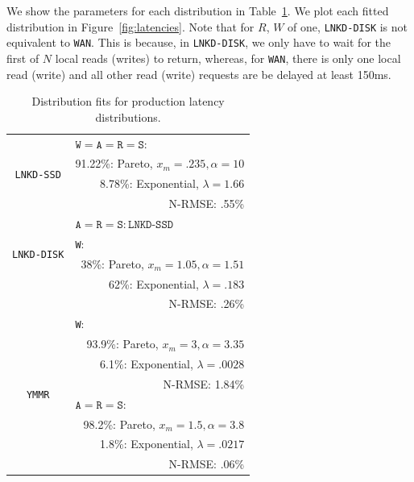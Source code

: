\documentclass{vldb}
\begin{document}
We show the parameters for each distribution in
Table~\ref{table:fits}. We plot each fitted distribution in
Figure~\ref{fig:latencies}.  Note that for $R$, $W$ of one,
\texttt{LNKD-DISK} is not equivalent to \texttt{WAN}.  This is
because, in \texttt{LNKD-DISK}, we only have to wait for the first of
$N$ local reads (writes) to return, whereas, for \texttt{WAN}, there
is only one local read (write) and all other read (write) requests are
be delayed at least 150ms.


\begin{table}
\centering
\begin{tabular}{|c|r|}
\hline
\multirow{4}{*}{\texttt{LNKD-SSD}} & \multicolumn{1}{|l|}{$\texttt{W} = \texttt{A}= \texttt{R} = \texttt{S}:$} \\
& 91.22\%: Pareto, $x_m=.235, \alpha=10$\\
& 8.78\%: Exponential, $\lambda = 1.66$ \\
& N-RMSE: .55\%\\\hline
\multirow{4}{*}{\texttt{LNKD-DISK}} & \multicolumn{1}{|l|}{$\texttt{A}= \texttt{R} = \texttt{S}: \texttt{LNKD-SSD}$}\\\cline{2-2}
& \multicolumn{1}{|l|}{\texttt{W}:}\\
& 38\%: Pareto, $x_m=1.05, \alpha=1.51$\\
& \hfill 62\%: Exponential, $\lambda = .183$ \\
& N-RMSE: .26\%\\
\hline
\multirow{8}{*}{\texttt{YMMR}} & \multicolumn{1}{|l|}{\texttt{W}:} \\
& 93.9\%: Pareto, $x_m=3, \alpha=3.35$\\
& 6.1\%: Exponential, $\lambda = .0028$ \\
& N-RMSE: 1.84\%\\\cline{2-2}
& \multicolumn{1}{|l|}{$\texttt{A}= \texttt{R} = \texttt{S}:$}\\
& 98.2\%: Pareto, $x_m=1.5, \alpha=3.8$\\
& 1.8\%: Exponential, $\lambda=.0217$\\
& N-RMSE: .06\%\\
\hline
\end{tabular}
\vspace{-6pt}
\caption{Distribution fits for production latency distributions.}
\vspace{-12pt}
\label{table:fits}
\end{table}
\end{document}
